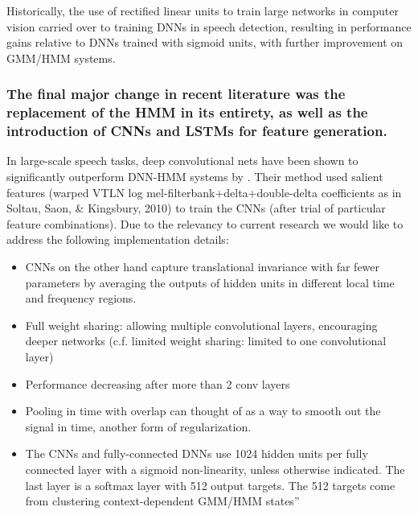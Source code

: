 \documentclass[12pt]{llncs}
\begin{document}


Historically, the use of rectified linear units to train large networks in computer vision carried over to training DNNs in speech detection, resulting in performance gains relative to DNNs trained with sigmoid units, with further improvement on GMM/HMM systems. \cite{dahl2013improving}




\subsubsection{The final major change in recent literature was the replacement of the HMM in its entirety, as well as the introduction of CNNs and LSTMs for feature generation.}
In large-scale speech tasks, deep convolutional nets have been shown to significantly outperform DNN-HMM systems by \cite{sainath2015deep}. Their method used salient features (warped VTLN log mel-filterbank+delta+double-delta coefficients as in Soltau, Saon, \& Kingsbury, 2010) to train the CNNs (after trial of particular feature combinations). Due to the relevancy to current research we would like to address the following implementation details: 
\begin{itemize}
	\item CNNs on the other hand capture translational invariance with far fewer parameters by averaging the outputs of hidden units in different local time and frequency regions.
	\item Full weight sharing: allowing multiple convolutional layers, encouraging deeper networks (c.f. limited weight sharing: limited to one convolutional layer)
	\item Performance decreasing after more than 2 conv layers
	\item Pooling in time with overlap can thought of as a way to smooth out the signal in time, another form of regularization.
    \item The CNNs and fully-connected DNNs use 1024 hidden units per fully connected layer with a sigmoid non-linearity, unless otherwise indicated. The last layer is a softmax layer with 512 output targets. The 512 targets come from clustering context-dependent GMM/HMM states''
\end{itemize}
\end{document}
